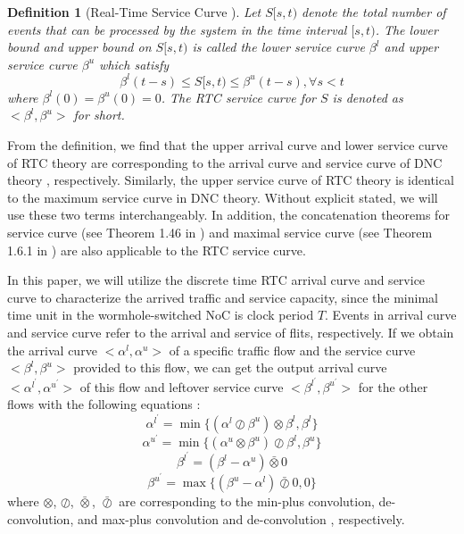 \documentclass[10pt,journal]{IEEEtran}
\newtheorem{definition}{Definition}
\begin{document}
\begin{definition}[Real-Time Service Curve \cite{1253607}]
Let $S[s,t)$ denote the total number of events that can be processed by the system in the time interval $[s,t)$. The lower bound and upper bound on $S[s,t)$ is called the lower service curve $\beta^l$ and upper service curve $\beta^u$ which satisfy
$$\beta^l(t-s)\leq S[s,t)\leq \beta^u(t-s),\forall s<t$$
where $\beta^l(0)=\beta^u(0)=0$. The RTC service curve for $S$ is denoted as $<\beta^l,\beta^u>$ for short.
\end{definition}

From the definition, we find that the upper arrival curve and lower service curve of RTC theory are corresponding to the arrival curve and service curve of DNC theory \cite{Boudec2001Network}, respectively. Similarly, the upper service curve of RTC theory is identical to the maximum service curve in DNC theory. Without explicit stated, we will use these two terms interchangeably. In addition, the concatenation theorems for service curve (see Theorem 1.46 in \cite{Boudec2001Network}) and maximal service curve (see Theorem 1.6.1 in \cite{Boudec2001Network}) are also applicable to the RTC service curve.

In this paper, we will utilize the discrete time RTC arrival curve and service curve to characterize the arrived traffic and service capacity, since the minimal time unit in the wormhole-switched NoC is clock period $T$. Events in arrival curve and service curve refer to the arrival and service of flits, respectively. If we obtain the arrival curve $<\alpha^l,\alpha^u>$ of a specific traffic flow and the service curve $<\beta^l,\beta^u>$ provided to this flow, we can get the output arrival curve $<\alpha^{l^\prime},\alpha^{u^\prime}>$ of this flow and leftover service curve $<\beta^{l^\prime},\beta^{u^\prime}>$ for the other flows with the following equations \cite{1253607}:
\begin{equation}\label{alphal}
\alpha^{l^\prime}=\min\{(\alpha^l\oslash\beta^u)\otimes\beta^l,\beta^l\}
\end{equation}
\begin{equation}\label{alphau}
\alpha^{u^\prime}=\min\{(\alpha^u\otimes\beta^u)\oslash\beta^l,\beta^u\}
\end{equation}
\begin{equation}\label{betal}
\beta^{l^\prime}=(\beta^l-\alpha^u)\bar{\otimes}0
\end{equation}
\begin{equation}\label{betau}
\beta^{u^\prime}=\max\{(\beta^u-\alpha^l)\bar{\oslash}0,0\}
\end{equation}
where $\otimes$, $\oslash$, $\bar{\otimes}$, $\bar{\oslash}$ are corresponding to the min-plus convolution, de-convolution, and max-plus convolution and de-convolution \cite{Boudec2001Network}, respectively.
\end{document}
